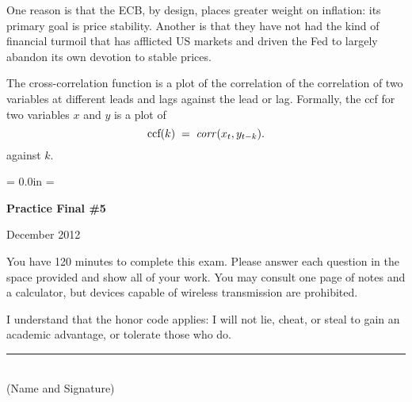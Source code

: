 \documentclass[letterpaper,12pt]{exam}
\def\HeadName{Practice Final \#1}
\begin{document}
\begin{questions}
\begin{solution}
\begin{parts}
\item One reason is that the ECB, by design,
places greater weight on inflation:  its primary goal is price stability.
Another is that they have not had the kind of financial turmoil
that has afflicted US markets and driven the Fed to
largely abandon its own devotion to stable prices.

\item The cross-correlation function is a plot of the correlation
of the correlation of two variables at different leads and lags
against the lead or lag.
Formally, the ccf for two variables $x$ and $y$ is a plot
of
\[
    \mbox{ccf}(k) \;=\;  \mbox{\it corr\/} (x_t,y_{t-k}) .
\]
against $k$.
\end{parts}
\end{solution}

\end{questions}




\newpage
\def\HeadName{Practice Final \#5}
\parindent = 0.0in
\parskip = \bigskipamount
\thispagestyle{empty}%
\Head

\centerline{\large \bf \HeadName}%
\centerline{December 2012}

\bigskip
You have 120 minutes to complete this exam.  Please answer each
question in the space provided and show all of your work.
You may consult one page of notes and a calculator,
but devices capable of wireless transmission are prohibited.

I understand that the honor code applies: I will not lie, cheat,
or steal to gain an academic advantage, or tolerate those who do.

\begin{flushright}
\rule{4in}{0.5pt} \\ (Name and Signature)
\end{flushright}
\end{document}
